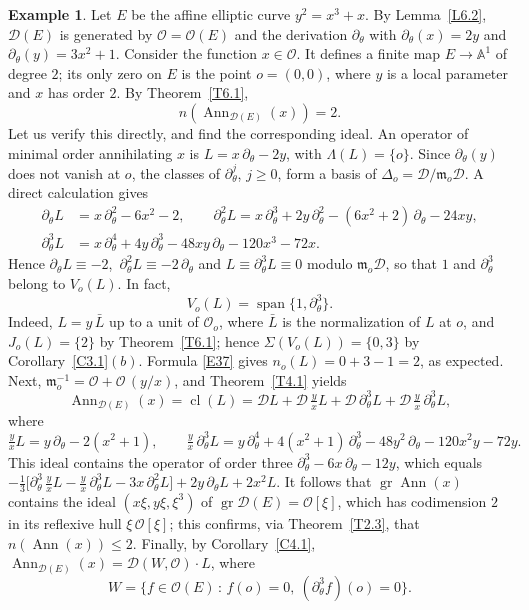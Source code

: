 \documentclass[11pt,reqno]{amsart}
\theoremstyle{plain}
\theoremstyle{definition}
\newtheorem{example}{Example}[section]
\theoremstyle{remark}
\numberwithin{equation}{section}
\newcommand{\cD}{\mathcal{D}}
\newcommand{\cO}{\mathcal{O}}
\newcommand{\A}{\mathbb{A}}
\newcommand{\del}{\partial}
\newcommand{\fm}{\mathfrak{m}}
\DeclareMathOperator{\Ann}{Ann}
\DeclareMathOperator{\cl}{cl}
\DeclareMathOperator{\gr}{gr}
\DeclareMathOperator{\spn}{span}
\begin{document}
\begin{example}
\label{Ex6.11}
Let $E$ be the affine elliptic curve $y^2 = x^3 + x$. By Lemma~\ref{L6.2}, $\cD(E)$ is generated
by $\cO = \cO(E)$ and the derivation $\del_\theta$ with $\del_\theta(x) = 2y$ and $\del_\theta(y)
= 3x^2 + 1$. Consider the function $x \in \cO$. It defines a finite map $E \to \A^1$ of degree
$2$; its only zero on $E$ is the point $o = (0,0)$, where $y$ is a local parameter and $x$ has
order $2$. By Theorem~\ref{T6.1},
\[
  n(\Ann_{\cD(E)}(x)) = 2 .
\]
Let us verify this directly, and find the corresponding ideal. An operator of minimal order
annihilating $x$ is $L = x\, \del_\theta - 2y$, with $\Lambda(L) = \{o\}$. Since $\del_\theta(y)$
does not vanish at $o$, the classes of $\del_\theta^j$, $j \ge 0$, form a basis of $\Delta_o =
\cD/\fm_o \cD$. A direct calculation gives
\begin{align*}
  \del_\theta L & = x\, \del_\theta^2 - 6x^2 - 2 , \qquad \del_\theta^2 L = x\, \del_\theta^3 + 2y\,
  \del_\theta^2 - (6x^2 + 2)\, \del_\theta - 24 xy , \\
  \del_\theta^3 L & = x\, \del_\theta^4 + 4y\, \del_\theta^3 - 48 xy\, \del_\theta - 120 x^3 - 72 x .
\end{align*}
Hence $\del_\theta L \equiv -2$, $\,\del_\theta^2 L \equiv - 2\, \del_\theta$ and $L \equiv
\del_\theta^3 L \equiv 0$ modulo $\fm_o \cD$, so that $1$ and $\del_\theta^3$ belong to
$V_o(L)$. In fact,
\[
  V_o(L) = \spn\{1, \del_\theta^3\} .
\]
Indeed, $L = y\, \bar L$ up to a unit of $\cO_o$, where $\bar L$ is the normalization of $L$ at $o$,
and $J_o(L) = \{2\}$ by Theorem~\ref{T6.1}; hence $\Sigma(V_o(L)) = \{0, 3\}$ by
Corollary~\ref{C3.1}$(b)$. Formula \eqref{E37} gives $n_o(L) = 0 + 3 - 1 = 2$, as expected. Next,
$\fm_o^{-1} = \cO + \cO\,(y/x)$, and Theorem~\ref{T4.1} yields
\[
  \Ann_{\cD(E)}(x) = \cl(L) = \cD L + \cD\, \tfrac{y}{x} L + \cD\, \del_\theta^3 L + \cD\,
  \tfrac{y}{x}\, \del_\theta^3 L ,
\]
where
\[
  \tfrac{y}{x} L = y\, \del_\theta - 2(x^2 + 1) , \qquad \tfrac{y}{x}\, \del_\theta^3 L = y\,
  \del_\theta^4 + 4(x^2 + 1)\, \del_\theta^3 - 48 y^2\, \del_\theta - 120 x^2 y - 72 y .
\]
This ideal contains the operator of order three $\del_\theta^3 - 6x\, \del_\theta - 12 y$, which
equals $-\frac{1}{3}\bigl[\del_\theta^3\, \tfrac{y}{x} L - \tfrac{y}{x}\, \del_\theta^3 L - 3x\,
\del_\theta^2 L\bigr] + 2y\, \del_\theta L + 2x^2 L$. It follows that $\gr \Ann(x)$ contains the
ideal $(x \xi, y \xi, \xi^3)$ of $\gr \cD(E) = \cO[\xi]$, which has codimension $2$ in its
reflexive hull $\xi\, \cO[\xi]$; this confirms, via Theorem~\ref{T2.3}, that $n(\Ann(x)) \le 2$.
Finally, by Corollary~\ref{C4.1}, $\Ann_{\cD(E)}(x) = \cD(W, \cO) \cdot L$, where
\[
  W = \{ f \in \cO(E) \, : \, f(o) = 0 , \ (\del_\theta^3 f)(o) = 0 \} .
\]
\end{example}
\end{document}
